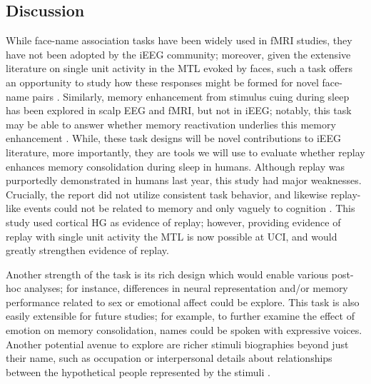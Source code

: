 \subsection*{Discussion}
While face-name association tasks have been widely used in fMRI studies, they have not been adopted by the iEEG community; moreover, given the extensive literature on single unit activity in the MTL evoked by faces, such a task offers an opportunity to study how these responses might be formed for novel face-name pairs \citep{Quiroga2005, Mormann2015, Viskontas2016}. Similarly, memory enhancement from stimulus cuing during sleep has been explored in scalp EEG and fMRI, but not in iEEG; notably, this task may be able to answer whether memory reactivation underlies this memory enhancement \citep{Rasch2007a,Antony2012,Creery2015, Makov2017e}. While, these task designs will be novel contributions to iEEG literature, more importantly, they are tools we will use to evaluate whether replay enhances memory consolidation during sleep in humans. Although replay was purportedly demonstrated in humans last year, this study had major weaknesses. Crucially, the report did not utilize consistent task behavior, and likewise replay-like events could not be related to memory and only vaguely to cognition \citep{Jiang2017}. This study used cortical HG as evidence of replay; however, providing evidence of replay with single unit activity the MTL is now possible at UCI, and would greatly strengthen evidence of replay. 

Another strength of the task is its rich design which would enable various post-hoc analyses; for instance, differences in neural representation and/or memory performance related to sex or emotional affect could be explore. This task is also easily extensible for future studies; for example, to further examine the effect of emotion on memory consolidation, names could be spoken with expressive voices. Another potential avenue to explore are richer stimuli biographies beyond just their name, such as occupation or interpersonal details about relationships between the hypothetical people represented by the stimuli \citep{Rentz2011}. 

